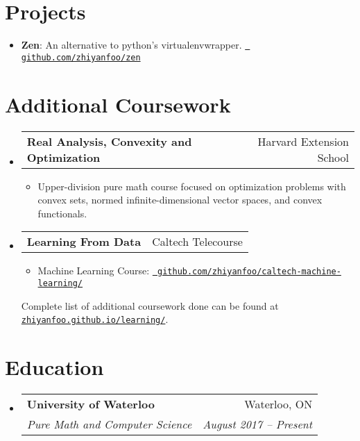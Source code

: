\documentclass[letterpaper,11pt]{article}
\makeatletter
\newcommand{\resumeItem}[2]{
  \item\small{
    \textbf{#1}{: #2 \vspace{-2pt}}
  }
}
\newcommand{\resumeSubheading}[4]{
  \vspace{-1pt}\item
    \begin{tabular*}{0.97\textwidth}{l@{\extracolsep{\fill}}r}
      \textbf{#1} & #2 \\
      \textit{\small#3} & \textit{\small #4} \\
    \end{tabular*}\vspace{-5pt}
}
\newcommand{\courseSubheading}[2]{
  \vspace{-1pt}\item
    \begin{tabular*}{0.97\textwidth}{l@{\extracolsep{\fill}}r}
      \textbf{#1} & #2 \\
    \end{tabular*}\vspace{-5pt}
}
\newcommand{\courseItem}[1]{
  \item\small{
    {#1 \vspace{-2pt}}
  }
}
\newcommand{\resumeSubItem}[2]{\resumeItem{#1}{#2}\vspace{-4pt}}
\newcommand{\resumeSubHeadingListStart}{\begin{itemize}[leftmargin=*, label={}]}
\newcommand{\resumeSubHeadingListEnd}{\end{itemize}}
\newcommand{\resumeItemListStart}{\begin{itemize}[label={}]}
\newcommand{\resumeItemListEnd}{\end{itemize}\vspace{-5pt}}
\makeatother
\begin{document}
\section{Projects}
  \resumeSubHeadingListStart
    \resumeSubItem{Zen}
      {An alternative to python's virtualenvwrapper.
            \href{https://github.com/zhiyanfoo/zen}{\tt
            github.com/zhiyanfoo/zen}
      }
  \resumeSubHeadingListEnd

\section{Additional Coursework}
 \resumeSubHeadingListStart
    \courseSubheading
      {Real Analysis, Convexity and Optimization}{Harvard Extension School}
      \resumeItemListStart
        \courseItem
          {Upper-division pure math course focused on optimization problems
            with convex sets, normed infinite-dimensional vector spaces, and
            convex functionals.}
      \resumeItemListEnd
    \courseSubheading
      {Learning From Data}{Caltech Telecourse}
      \resumeItemListStart
        \courseItem {Machine Learning Course:
    \href{https://github.com/zhiyanfoo/caltech-machine-learning/}{\tt
    github.com/zhiyanfoo/caltech-machine-learning/}}
      \resumeItemListEnd
\vspace{5pt}
 Complete list of additional coursework done can be found at
\href{https://zhiyanfoo.github.io/learning/}{\tt zhiyanfoo.github.io/learning/}.
 \resumeSubHeadingListEnd




\section{Education}
  \resumeSubHeadingListStart
    \resumeSubheading
      {University of Waterloo}{Waterloo, ON}
      {Pure Math and Computer Science}{August 2017 -- Present}
  \resumeSubHeadingListEnd
\end{document}
